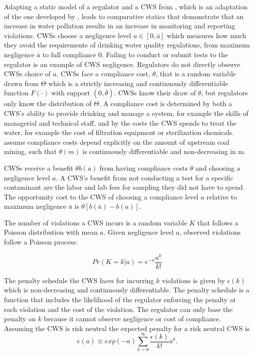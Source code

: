 \documentclass{article}
\begin{document}
Adapting a static model of a regulator and a CWS from \cite{kang2021understanding}, which is an adaptation of the one developed by \cite{mookherjee1994marginal}, leads to comparative statics that demonstrate that an increase in water pollution results in an increase in monitoring and reporting violations. CWSs choose a negligence level $a \in [0,\bar{a}]$ which measures how much they avoid the requirements of drinking water quality regulations, from maximum negligence $\bar{a}$ to full compliance 0. Failing to conduct or submit tests to the regulator is an example of CWS negligence. Regulators do not directly observe CWSs choice of $a$. CWSs face a compliance cost, $\theta$, that is a random variable drawn from $\Theta$ which is a strictly increasing and continuously differentiable function $F(\cdot)$ with support $(0,\bar{\theta})$. CWSs know their draw of $\theta$, but regulators only know the distribution of $\Theta$. A compliance cost is determined by both a CWS's ability to provide drinking and manage a system, for example the skills of managerial and technical staff, and by the costs the CWS spends to treat the water, for example the cost of filtration equipment or sterilization chemicals. assume compliance costs depend explicitly on the amount of upstream coal mining, such that $\theta (m)$ is continuously differentiable and non-decreasing in m.

CWSs receive a benefit $\theta b(a)$ from having compliance costs $\theta$ and choosing a negligence level $a$. A CWS's benefit from not conducting a test for a specific contaminant are the labor and lab fees for sampling they did not have to spend. The opportunity cost to the CWS of choosing a compliance level $a$ relative to maximum negligence $\bar{a}$ is $\theta [b(\bar{a})-b(a)]$.

The number of violations a CWS incurs is a random variable $K$ that follows a Poisson distribution with mean $a$. Given negligence level $a$, observed violations follow a Poisson process:

\[Pr(K = k | a) = e^{-a}  \frac{a^k}{k!}\]

The penalty schedule the CWS faces for incurring $k$ violations is given by $\epsilon(k)$ which is non-decreasing and continuously differentiable. The penalty schedule is a function that includes the likelihood of the regulator enforcing the penalty at each violation and the cost of the violation. The regulator can only base the penalty on $k$ because it cannot observe negligence or cost of compliance. Assuming the CWS is risk neutral the expected penalty for a risk neutral CWS is 
\begin{equation}
    e(a)\equiv exp(-a)\sum^\infty_{k=0}\frac{\epsilon(k)}{k!}a^k.
\end{equation}
\end{document}
